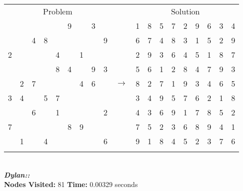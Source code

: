 \documentclass{article}
\begin{document}
\begin{tabular}{||c|c|c||c|c|c||c|c|c|| c ||c|c|c||c|c|c||c|c|c||}
  \cmidrule{1-9} \cmidrule{11-19}
  \multicolumn{9}{|c|}{Problem} &                   & \multicolumn{9}{|c|}{Solution}   \\\cmidrule{1-9} \cmidrule{11-19} \morecmidrules \cmidrule{1-9} \cmidrule{11-19}
1 &   &   &   &   & 9 &   & 3 &   &  & 1 & 8 & 5 & 7 & 2 & 9 & 6 & 3 & 4\\\cmidrule{1-9} \cmidrule{11-19}
  &   & 4 & 8 &   &   &   &   & 9 &  & 6 & 7 & 4 & 8 & 3 & 1 & 5 & 2 & 9\\\cmidrule{1-9} \cmidrule{11-19}
2 &   &   &   & 4 &   & 1 &   &   &  & 2 & 9 & 3 & 6 & 4 & 5 & 1 & 8 & 7\\\cmidrule{1-9} \cmidrule{11-19} \morecmidrules \cmidrule{1-9} \cmidrule{11-19}
  &   &   &   & 8 & 4 &   & 9 & 3 &  & 5 & 6 & 1 & 2 & 8 & 4 & 7 & 9 & 3\\\cmidrule{1-9} \cmidrule{11-19}
  & 2 & 7 &   &   &   & 4 & 6 &   & $\rightarrow$ & 8 & 2 & 7 & 1 & 9 & 3 & 4 & 6 & 5\\\cmidrule{1-9} \cmidrule{11-19}
3 & 4 &   & 5 & 7 &   &   &   &   &  & 3 & 4 & 9 & 5 & 7 & 6 & 2 & 1 & 8\\\cmidrule{1-9} \cmidrule{11-19} \morecmidrules \cmidrule{1-9} \cmidrule{11-19}
  &   & 6 &   & 1 &   &   &   & 2 &  & 4 & 3 & 6 & 9 & 1 & 7 & 8 & 5 & 2\\\cmidrule{1-9} \cmidrule{11-19}
7 &   &   &   &   & 8 & 9 &   &   &  & 7 & 5 & 2 & 3 & 6 & 8 & 9 & 4 & 1\\\cmidrule{1-9} \cmidrule{11-19}
  & 1 &   & 4 &   &   &   &   & 6 &  & 9 & 1 & 8 & 4 & 5 & 2 & 3 & 7 & 6\\\cmidrule{1-9} \cmidrule{11-19} \morecmidrules \cmidrule{1-9} \cmidrule{11-19}

\end{tabular}
\\
\small\emph{\textbf{Dylan::}}\\ \textbf{Nodes Visited:} 81 \textbf{Time:} 0.00329 seconds\\
\end{document}
